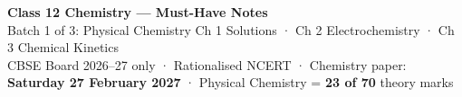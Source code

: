 \documentclass[10pt,a4paper]{extarticle}
\begin{document}
\small

\begin{tcolorbox}[enhanced,colback=navy,colframe=navy,arc=2pt,left=8pt,right=8pt,top=6pt,bottom=6pt]
\color{white}\sffamily
{\LARGE\bfseries Class 12 Chemistry — Must-Have Notes}\\[3pt]
{\large Batch 1 of 3: Physical Chemistry} \hfill {\small Ch 1 Solutions · Ch 2 Electrochemistry · Ch 3 Chemical Kinetics}\\[2pt]
{\footnotesize CBSE Board 2026--27 only · Rationalised NCERT · Chemistry paper: \textbf{Saturday 27 February 2027} · Physical Chemistry = \textbf{23 of 70} theory marks}
\end{tcolorbox}
\end{document}
